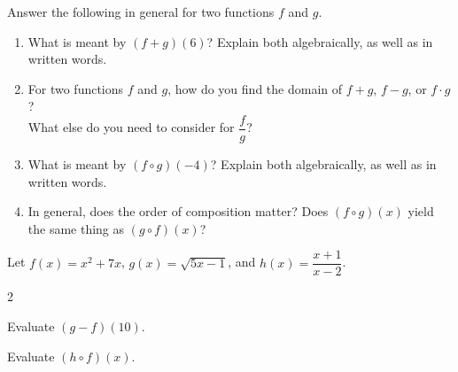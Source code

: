 \begin{myExit}
Answer the following in general for two functions $f$ and $g$.
	\begin{enumerate}
		\item What is meant by $(f + g)(6)$?  Explain both algebraically, as well as in written words.
		\vfill
		\item For two functions $f$ and $g$, how do you find the domain of $f + g$, $f-g$, or $f\cdot g$? \\
			What else do you need to consider for $\dfrac{f}{g}$?
		\vfill
		\item What is meant by $(f \circ g)(-4)$?  Explain both algebraically, as well as in written words.
		\vfill
		\item In general, does the order of composition matter? Does $(f \circ g)(x)$ yield the same thing as $(g \circ f)(x)$?
		\vfill
	\end{enumerate}
\end{myExit}

\begin{myExit}
Let $f(x) = x^2 + 7x$, $g(x) = \sqrt{5x-1}$, and $h(x) = \dfrac{x+1}{x-2} $.
	\begin{enumerate}
		\vfill
	\end{enumerate}
\end{myExit}

















